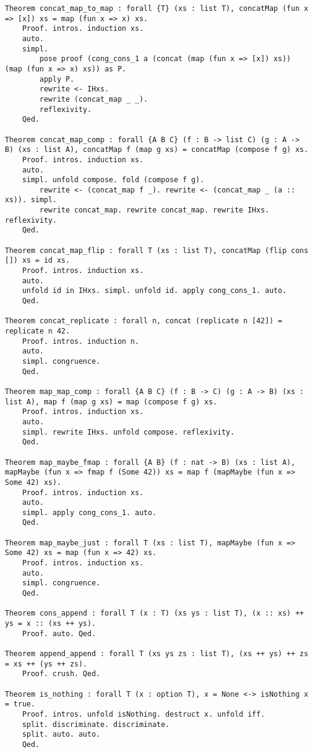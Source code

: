 \begin{verbatim}
Theorem concat_map_to_map : forall {T} (xs : list T), concatMap (fun x => [x]) xs = map (fun x => x) xs.
    Proof. intros. induction xs.
    auto.
    simpl.
        pose proof (cong_cons_1 a (concat (map (fun x => [x]) xs)) (map (fun x => x) xs)) as P.
        apply P.
        rewrite <- IHxs.
        rewrite (concat_map _ _).
        reflexivity.
    Qed.

Theorem concat_map_comp : forall {A B C} (f : B -> list C) (g : A -> B) (xs : list A), concatMap f (map g xs) = concatMap (compose f g) xs.
    Proof. intros. induction xs.
    auto.
    simpl. unfold compose. fold (compose f g).
        rewrite <- (concat_map f _). rewrite <- (concat_map _ (a :: xs)). simpl.
        rewrite concat_map. rewrite concat_map. rewrite IHxs. reflexivity.
    Qed.

Theorem concat_map_flip : forall T (xs : list T), concatMap (flip cons []) xs = id xs.
    Proof. intros. induction xs.
    auto.
    unfold id in IHxs. simpl. unfold id. apply cong_cons_1. auto.
    Qed.

Theorem concat_replicate : forall n, concat (replicate n [42]) = replicate n 42.
    Proof. intros. induction n.
    auto.
    simpl. congruence.
    Qed.

Theorem map_map_comp : forall {A B C} (f : B -> C) (g : A -> B) (xs : list A), map f (map g xs) = map (compose f g) xs.
    Proof. intros. induction xs.
    auto.
    simpl. rewrite IHxs. unfold compose. reflexivity.
    Qed.

Theorem map_maybe_fmap : forall {A B} (f : nat -> B) (xs : list A), mapMaybe (fun x => fmap f (Some 42)) xs = map f (mapMaybe (fun x => Some 42) xs).
    Proof. intros. induction xs.
    auto.
    simpl. apply cong_cons_1. auto.
    Qed.

Theorem map_maybe_just : forall T (xs : list T), mapMaybe (fun x => Some 42) xs = map (fun x => 42) xs.
    Proof. intros. induction xs.
    auto.
    simpl. congruence.
    Qed.

Theorem cons_append : forall T (x : T) (xs ys : list T), (x :: xs) ++ ys = x :: (xs ++ ys).
    Proof. auto. Qed.

Theorem append_append : forall T (xs ys zs : list T), (xs ++ ys) ++ zs = xs ++ (ys ++ zs).
    Proof. crush. Qed.

Theorem is_nothing : forall T (x : option T), x = None <-> isNothing x = true.
    Proof. intros. unfold isNothing. destruct x. unfold iff.
    split. discriminate. discriminate.
    split. auto. auto.
    Qed.


\end{verbatim}
